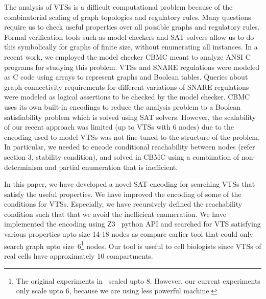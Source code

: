 The analysis of VTSs is a difficult computational problem because of the combinatorial scaling of graph topologies and regulatory rules. Many questions require us to check useful properties over all possible graphs and regulatory rules. Formal verification tools such as model checkers \cite{clarke1996symbolic, biere2003bounded, clarke2008birth, cimatti2000nusmv, holzmann1997model} and SAT solvers \cite{moskewicz2001chaff,een2004extensible} allow us to do this symbolically for graphs of finite size, without enumerating all instances. In a recent work, we employed the model checker CBMC \cite{CKY03, ckl2004} meant to analyze ANSI C programs for studying this problem. VTSs and SNARE regulations were modeled as C code using arrays to represent graphs and Boolean tables. Queries about graph connectivity requirements for different variations of SNARE regulations were modeled as logical assertions to be checked by the model checker. CBMC uses its own built-in encodings to reduce the analysis problem to a Boolean satisfiability problem which is solved using SAT solvers.
%
However, the scalability of our recent approach was limited (up to
VTSs with 6 nodes) due to the encoding used to model VTSs was not
fine-tuned to the structure of the problem.
%
In particular, we needed to encode conditional reachability between
nodes (refer section 3, stability condition), and solved in CBMC using a
combination of non-determinism and partial enumeration that is
inefficient.



In this paper, we have developed a novel SAT encoding for
searching VTSs that satisfy the useful properties.
%
We have improved the encoding of some of the conditions for VTSs.
%
Especially, we have recursively defined the reachability condition
such that that we avoid the inefficient enumeration.
%
%
%
We have implemented the encoding using Z3~\cite{z3} python API and
searched for VTS satisfying various properties upto size 14-18 nodes
as compare earlier tool that could only search graph upto
size~6\footnote{The original experiments in~\cite{shukla} scaled upto 8.
However, our current experiments only scale upto 6, because
we are using less powerful machine.} nodes.
%
Our tool is useful to cell biologists since VTSs of real cells have
approximately 10 compartments.

